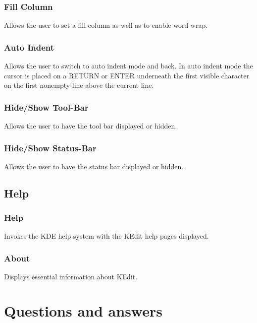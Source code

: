 \documentclass{article}
\begin{document}
\subsubsection{Fill Column}

Allows the user to set a fill column as well as to enable word wrap.


\subsubsection{Auto Indent}

Allows the user to switch to auto indent mode and back. In auto indent mode the 
cursor is placed on a  RETURN or ENTER underneath the first visible character 
on the first nonempty line above the current line.


\subsubsection{Hide/Show Tool-Bar}

Allows the user to have the tool bar displayed or hidden.


\subsubsection{Hide/Show Status-Bar}

Allows the user to have the status bar displayed or hidden.




\subsection{Help}




\subsubsection{Help}

Invokes the KDE help system with the KEdit help pages displayed.


\subsubsection{About }

Displays essential information about KEdit.




\section{Questions and answers}
\end{document}
